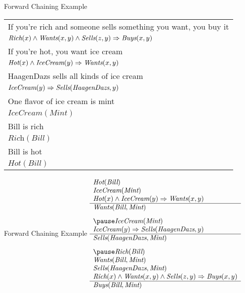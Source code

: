 \documentclass[14pt]{beamer}
\begin{document}
\begin{frame}{Forward Chaining Example}
	\begin{tabular}{p{}}
		If you're rich and someone sells something you want, you buy it \\
		\tab$\textit{Rich}(x) \land \textit{Wants}(x, y) \land \textit{Sells}(z, y) \Rightarrow \textit{Buys}(x, y)$ \\
		If you're hot, you want ice cream \\
		\tab$\textit{Hot}(x) \land \textit{IceCream}(y) \Rightarrow \textit{Wants}(x, y)$ \\
		HaagenDazs sells all kinds of ice cream \\
		\tab$\textit{IceCream}(y) \Rightarrow \textit{Sells}(\textit{HaagenDazs}, y)$ \\
		One flavor of ice cream is mint \\
		\tab$\textit{IceCream}(\textit{Mint})$ \\
		Bill is rich \\
		\tab$\textit{Rich}(\textit{Bill})$ \\
		Bill is hot \\
		\tab$\textit{Hot}(\textit{Bill})$
	\end{tabular}
\end{frame}
\begin{frame}{Forward Chaining Example}
	$
	\begin{array}{l}
		\textit{Hot}(\textit{Bill}) \\
		\textit{IceCream}(\textit{Mint}) \\
		\textit{Hot}(x) \land \textit{IceCream}(y) \limpl \textit{Wants}(x, y) \\
		\hline
		\textit{Wants}(\textit{Bill}, \textit{Mint}) \\[.8em]
		\pause
		\textit{IceCream}(\textit{Mint}) \\
		\textit{IceCream}(y) \limpl \textit{Sells}(\textit{HaagenDazs}, y) \\
		\hline
		\textit{Sells}(\textit{HaagenDazs}, \textit{Mint}) \\[.8em]
		\pause
		\textit{Rich}(\textit{Bill}) \\
		\textit{Wants}(\textit{Bill}, \textit{Mint}) \\
		\textit{Sells}(\textit{HaagenDazs}, \textit{Mint}) \\
		\textit{Rich}(x) \land \textit{Wants}(x, y) \land \textit{Sells}(z, y) \limpl \textit{Buys}(x, y) \\
		\hline
		\textit{Buys}(\textit{Bill}, \textit{Mint})
	\end{array}
	$
\end{frame}
\end{document}
